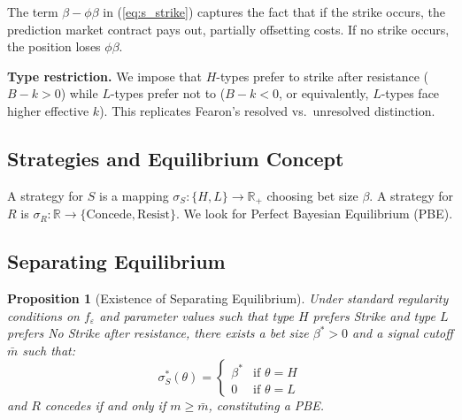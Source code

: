 \documentclass[12pt]{article}
\newtheorem{proposition}{Proposition}
\newcommand{\R}{\mathbb{R}}
\begin{document}
The term $\beta - \phi\beta$ in (\ref{eq:s_strike}) captures the fact that if the strike occurs, the prediction market contract pays out, partially offsetting costs. If no strike occurs, the position loses $\phi\beta$.

\textbf{Type restriction.} We impose that $H$-types prefer to strike after resistance ($B - k > 0$) while $L$-types prefer not to ($B - k < 0$, or equivalently, $L$-types face higher effective $k$). This replicates Fearon's resolved vs.\ unresolved distinction.

\subsection{Strategies and Equilibrium Concept}

A strategy for $S$ is a mapping $\sigma_S: \{H, L\} \to \R_+$ choosing bet size $\beta$. A strategy for $R$ is $\sigma_R: \R \to \{\text{Concede}, \text{Resist}\}$. We look for Perfect Bayesian Equilibrium (PBE).

\subsection{Separating Equilibrium}

\begin{proposition}[Existence of Separating Equilibrium]\label{prop:sep}
Under standard regularity conditions on $f_\varepsilon$ and parameter values such that type $H$ prefers Strike and type $L$ prefers No Strike after resistance, there exists a bet size $\beta^* > 0$ and a signal cutoff $\bar{m}$ such that:
\begin{equation}
\sigma_S^*(\theta) = \begin{cases} \beta^* & \text{if } \theta = H \\ 0 & \text{if } \theta = L \end{cases}
\end{equation}
and $R$ concedes if and only if $m \geq \bar{m}$, constituting a PBE.
\end{proposition}
\end{document}
